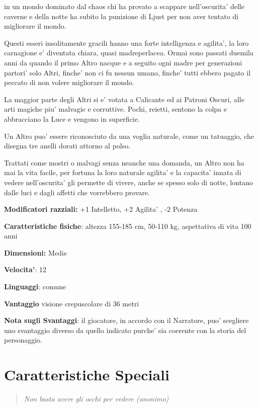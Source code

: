 \documentclass[a4paper,11pt,twoside,openany]{book}
\begin{document}
	\label{altri}
	
	in un mondo dominato dal chaos chi ha provato a scappare nell'oscurita' delle caverne e della notte ha subito la punizione di Ljust per non aver tentato di migliorare il mondo.
	
	Questi esseri insolitamente gracili hanno una forte intelligenza e agilita', la loro carnagione e' diventata chiara, quasi madreperlacea. Ormai sono passati duemila anni da quando il primo Altro nacque e a seguito ogni madre per generazioni partori' solo Altri, finche' non ci fu nessun umano, finche' tutti ebbero pagato il peccato di non volere migliorare il mondo.
	
	La maggior parte degli Altri si e' votata a Calicante ed ai Patroni Oscuri, alle arti magiche piu' malvagie e corruttive. Pochi, reietti, sentono la colpa e abbracciano la Luce e vengono in superficie.
	
	Un Altro puo' essere riconosciuto da una voglia naturale, come un tatuaggio, che disegna tre anelli dorati attorno al polso.
	
	Trattati come mostri o malvagi senza neanche una domanda, un Altro non ha mai la vita facile, per fortuna la loro naturale agilita' e la capacita' innata di vedere nell'oscurita' gli permette di vivere, anche se spesso solo di notte, lontano dalle luci e dagli affetti che vorrebbero provare.
	
	\textbf{Modificatori razziali:} +1 Intelletto, +2 Agilita' , -2 Potenza
	
	\textbf{Caratteristiche fisiche}: altezza 155-185 cm, 50-110 kg, aspettativa
	di vita 100 anni
	
	\textbf{Dimensioni:} Medie
	
	\textbf{Velocita'}: 12
	
	\textbf{Linguaggi}: comune
	
	\textbf{Vantaggio} visione crepuscolare di 36 metri
	
	\bigskip
	
	\textbf{Nota sugli Svantaggi}: il giocatore, in accordo con il Narratore, puo' scegliere uno svantaggio diverso da quello indicato purche' sia coerente con la storia del personaggio.
	
	
	\pagebreak
	
	\section{Caratteristiche Speciali}
	
	\label{caratteristiche-speciali}
	\begin{quote}\textit{Non basta avere gli occhi per vedere (anonimo)
	}\end{quote}
	
\end{document}
